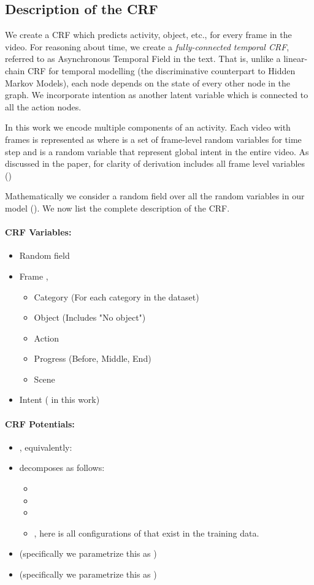\documentclass[10pt,twocolumn,letterpaper]{article}
\begin{document}
\subsection{Description of the CRF}

We create a CRF which predicts activity, object, etc., for every frame in the video. For reasoning about time, we create a \emph{fully-connected temporal CRF}, referred to as Asynchronous Temporal Field in the text. That is, unlike a linear-chain CRF for temporal modelling (the discriminative counterpart to Hidden Markov Models), each node depends on the state of every other node in the graph. We incorporate intention as another latent variable which is connected to all the action nodes.

In this work we encode multiple components of an activity. Each video with  frames is represented as  where  is a set of frame-level random variables for time step  and  is a random variable that represent global intent in the entire video. As discussed in the paper, for clarity of derivation  includes all frame level variables ()

Mathematically we consider a random field  over all the random variables in our model (). We now list the complete description of the CRF.

\paragraph{CRF Variables:}
\begin{itemize} 
\item Random field 
\item Frame , 
\begin{itemize}
    \item Category  (For each category in the dataset)
    \item Object  (Includes "No object")
    \item Action 
    \item Progress  (Before, Middle, End)
    \item Scene 
\end{itemize}
\item Intent  ( in this work)
\end{itemize}


\paragraph{CRF Potentials:}
\begin{itemize} 
\item , equivalently: 
\item  decomposes as follows: 
\begin{itemize}
    \item 
    \item 
    \item 
    \item , here  is all configurations of  that exist in the training data.
\end{itemize}
\item  (specifically we parametrize this as )
\item  (specifically we parametrize this as )
\end{itemize}
\end{document}
